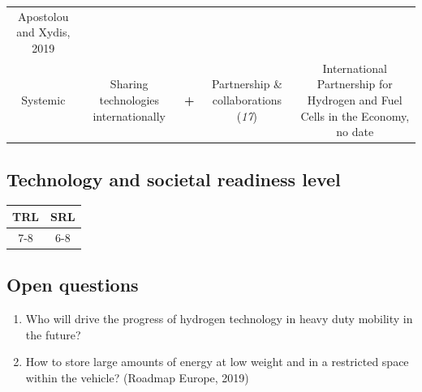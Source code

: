 \documentclass[
]{book}
\providecommand{\tightlist}{%
  \setlength{\itemsep}{0pt}\setlength{\parskip}{0pt}}
\begin{document}
\begin{longtable}[]{@{}ccccc@{}}
\begin{minipage}[t]{0.17\columnwidth}
Apostolou and Xydis, 2019\strut
\end{minipage}\tabularnewline
\begin{minipage}[t]{0.17\columnwidth}\centering
Systemic\strut
\end{minipage} & \begin{minipage}[t]{0.16\columnwidth}\centering
Sharing technologies internationally\strut
\end{minipage} & \begin{minipage}[t]{0.17\columnwidth}\centering
\textbf{+}\strut
\end{minipage} & \begin{minipage}[t]{0.17\columnwidth}\centering
Partnership \& collaborations (\emph{17})\strut
\end{minipage} & \begin{minipage}[t]{0.17\columnwidth}\centering
International Partnership for Hydrogen and Fuel Cells in the Economy, no date\strut
\end{minipage}\tabularnewline
\bottomrule
\end{longtable}

\hypertarget{technology-and-societal-readiness-level-13}{%
\subsection*{Technology and societal readiness level}\label{technology-and-societal-readiness-level-13}}

\begin{longtable}[]{@{}cc@{}}
\toprule
TRL & SRL\tabularnewline
\midrule
\endhead
7-8 & 6-8\tabularnewline
\bottomrule
\end{longtable}

\hypertarget{open-questions-13}{%
\subsection*{Open questions}\label{open-questions-13}}

\begin{enumerate}
\def\labelenumi{\arabic{enumi}.}
\tightlist
\item
  Who will drive the progress of hydrogen technology in heavy duty mobility in the future?
\item
  How to store large amounts of energy at low weight and in a restricted space within the vehicle? (Roadmap Europe, 2019)
\end{enumerate}
\end{document}
